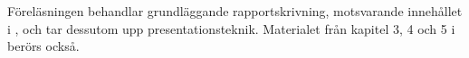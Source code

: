 Föreläsningen behandlar grundläggande rapportskrivning, motsvarande innehållet 
i  \cite{MiUn2012rft}, och tar dessutom upp 
presentationsteknik.
Materialet från kapitel 3, 4 och 5 i  
\cite{beameruserguide} berörs också.

